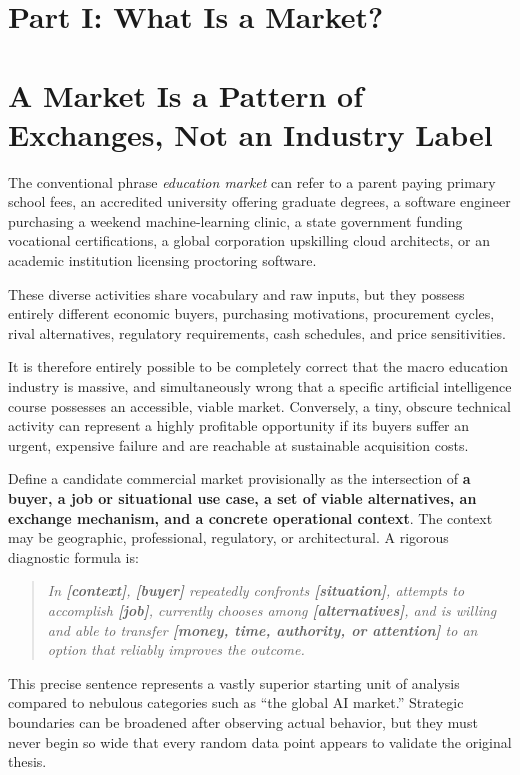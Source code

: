 \section*{Part I: What Is a Market?}

\section{A Market Is a Pattern of Exchanges, Not an Industry Label}

The conventional phrase \textit{education market} can refer to a parent paying primary school fees, an accredited university offering graduate degrees, a software engineer purchasing a weekend machine-learning clinic, a state government funding vocational certifications, a global corporation upskilling cloud architects, or an academic institution licensing proctoring software.

These diverse activities share vocabulary and raw inputs, but they possess entirely different economic buyers, purchasing motivations, procurement cycles, rival alternatives, regulatory requirements, cash schedules, and price sensitivities.

It is therefore entirely possible to be completely correct that the macro education industry is massive, and simultaneously wrong that a specific artificial intelligence course possesses an accessible, viable market. Conversely, a tiny, obscure technical activity can represent a highly profitable opportunity if its buyers suffer an urgent, expensive failure and are reachable at sustainable acquisition costs.

Define a candidate commercial market provisionally as the intersection of \textbf{a buyer, a job or situational use case, a set of viable alternatives, an exchange mechanism, and a concrete operational context}. The context may be geographic, professional, regulatory, or architectural. A rigorous diagnostic formula is:

\begin{quote}
\itshape
In \textbf{[context]}, \textbf{[buyer]} repeatedly confronts \textbf{[situation]}, attempts to accomplish \textbf{[job]}, currently chooses among \textbf{[alternatives]}, and is willing and able to transfer \textbf{[money, time, authority, or attention]} to an option that reliably improves the outcome.
\end{quote}

This precise sentence represents a vastly superior starting unit of analysis compared to nebulous categories such as ``the global AI market.'' Strategic boundaries can be broadened after observing actual behavior, but they must never begin so wide that every random data point appears to validate the original thesis.

